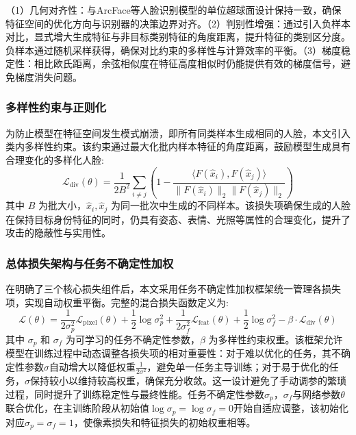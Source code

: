 （1）几何对齐性：与ArcFace等人脸识别模型的单位超球面设计保持一致，确保特征空间的优化方向与识别器的决策边界对齐。（2）判别性增强：通过引入负样本对比，显式增大生成特征与非目标类别特征的角度距离，提升特征的类别区分度。负样本通过随机采样获得，确保对比约束的多样性与计算效率的平衡。（3）梯度稳定性：相比欧氏距离，余弦相似度在特征高度相似时仍能提供有效的梯度信号，避免梯度消失问题。

\subsubsection{多样性约束与正则化}

为防止模型在特征空间发生模式崩溃，即所有同类样本生成相同的人脸，本文引入类内多样性约束。该约束通过最大化批内样本特征的角度距离，鼓励模型生成具有合理变化的多样化人脸:
\begin{equation}\label{eq:tia_diversity_loss}
    \mathcal{L}_{\text{div}}(\theta) = \frac{1}{2B^2} \sum_{i \neq j} \left( 1 - \frac{\langle F(\hat{x}_i), F(\hat{x}_j) \rangle}{\|F(\hat{x}_i)\|_2 \|F(\hat{x}_j)\|_2} \right)
\end{equation}
其中 $B$ 为批大小，$\hat{x}_i, \hat{x}_j$ 为同一批次中生成的不同样本。该损失项确保生成的人脸在保持目标身份特征的同时，仍具有姿态、表情、光照等属性的合理变化，提升了攻击的隐蔽性与实用性。

\subsubsection{总体损失架构与任务不确定性加权}

在明确了三个核心损失组件后，本文采用任务不确定性加权框架统一管理各损失项，实现自动权重平衡。完整的混合损失函数定义为:
\begin{equation}\label{eq:tia_total_loss}
    \mathcal{L}(\theta) = \frac{1}{2\sigma_p^2} \mathcal{L}_{\text{pixel}}(\theta) + \frac{1}{2}\log\sigma_p^2 + \frac{1}{2\sigma_f^2} \mathcal{L}_{\text{feat}}(\theta) + \frac{1}{2}\log\sigma_f^2 - \beta \cdot \mathcal{L}_{\text{div}}(\theta)
\end{equation}
其中 $\sigma_p$ 和 $\sigma_f$ 为可学习的任务不确定性参数，$\beta$ 为多样性约束权重。该框架允许模型在训练过程中动态调整各损失项的相对重要性：对于难以优化的任务，其不确定性参数$\sigma$自动增大以降低权重$\frac{1}{2\sigma^2}$，避免单一任务主导训练；对于易于优化的任务，$\sigma$保持较小以维持较高权重，确保充分收敛。这一设计避免了手动调参的繁琐过程，同时提升了训练稳定性与最终性能。任务不确定性参数$\sigma_p， \sigma_f$与网络参数$\theta$联合优化，在主训练阶段从初始值$\log\sigma_p = \log\sigma_f = 0$开始自适应调整，该初始化对应$\sigma_p = \sigma_f = 1$，使像素损失和特征损失的初始权重相等。

